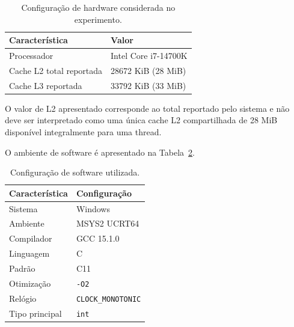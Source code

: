\begin{table}[H]
    \centering

    \caption{Configuração de hardware considerada no experimento.}
    \label{tab:atvd01-hardware}

    \begin{tabular}{ll}
        \toprule
        \textbf{Característica}
        &
        \textbf{Valor}
        \\
        \midrule

        Processador
        &
        Intel Core i7-14700K
        \\

        Cache L2 total reportada
        &
        28672 KiB (28 MiB)
        \\

        Cache L3 reportada
        &
        33792 KiB (33 MiB)
        \\

        \bottomrule
    \end{tabular}

\end{table}

O valor de L2 apresentado corresponde ao total reportado pelo sistema e
não deve ser interpretado como uma única cache L2 compartilhada de
28 MiB disponível integralmente para uma thread.

O ambiente de software é apresentado na
Tabela~\ref{tab:atvd01-software}.

\begin{table}[H]
    \centering

    \caption{Configuração de software utilizada.}
    \label{tab:atvd01-software}

    \begin{tabular}{ll}
        \toprule
        \textbf{Característica}
        &
        \textbf{Configuração}
        \\
        \midrule

        Sistema
        &
        Windows
        \\

        Ambiente
        &
        MSYS2 UCRT64
        \\

        Compilador
        &
        GCC 15.1.0
        \\

        Linguagem
        &
        C
        \\

        Padrão
        &
        C11
        \\

        Otimização
        &
        \texttt{-O2}
        \\

        Relógio
        &
        \texttt{CLOCK\_MONOTONIC}
        \\

        Tipo principal
        &
        \texttt{int}
        \\

        \bottomrule
    \end{tabular}

\end{table}


